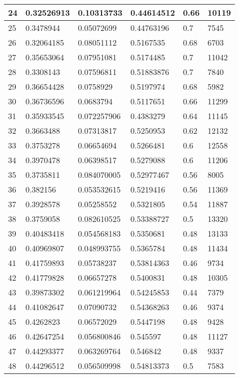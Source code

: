 \begin{longtable}{|l|l|l|l|l|l|}
24 & 0.32526913 & 0.10313733 & 0.44614512 & 0.66 & 10119 \\ \hline 
25 & 0.3478944 & 0.05072699 & 0.44763196 & 0.7 & 7545 \\ \hline 
26 & 0.32064185 & 0.08051112 & 0.5167535 & 0.68 & 6703 \\ \hline 
27 & 0.35653064 & 0.07951081 & 0.5174485 & 0.7 & 11042 \\ \hline 
28 & 0.3308143 & 0.07596811 & 0.51883876 & 0.7 & 7840 \\ \hline 
29 & 0.36654428 & 0.0758929 & 0.5197974 & 0.68 & 5982 \\ \hline 
30 & 0.36736596 & 0.0683794 & 0.5117651 & 0.66 & 11299 \\ \hline 
31 & 0.35933545 & 0.072257906 & 0.4383279 & 0.64 & 11145 \\ \hline 
32 & 0.3663488 & 0.07313817 & 0.5250953 & 0.62 & 12132 \\ \hline 
33 & 0.3753278 & 0.06654694 & 0.5266481 & 0.6 & 12558 \\ \hline 
34 & 0.3970478 & 0.06398517 & 0.5279088 & 0.6 & 11206 \\ \hline 
35 & 0.3735811 & 0.084070005 & 0.52977467 & 0.56 & 8005 \\ \hline 
36 & 0.382156 & 0.053532615 & 0.5219416 & 0.56 & 11369 \\ \hline 
37 & 0.3928578 & 0.05258552 & 0.5321805 & 0.54 & 11887 \\ \hline 
38 & 0.3759058 & 0.082610525 & 0.53388727 & 0.5 & 13320 \\ \hline 
39 & 0.40483418 & 0.054568183 & 0.5350681 & 0.48 & 13133 \\ \hline 
40 & 0.40969807 & 0.048993755 & 0.5365784 & 0.48 & 11434 \\ \hline 
41 & 0.41759893 & 0.05738237 & 0.53814363 & 0.46 & 9734 \\ \hline 
42 & 0.41779828 & 0.06657278 & 0.5400831 & 0.48 & 10305 \\ \hline 
43 & 0.39873302 & 0.061219964 & 0.54245853 & 0.44 & 7379 \\ \hline 
44 & 0.41082647 & 0.07090732 & 0.54368263 & 0.46 & 9374 \\ \hline 
45 & 0.4262823 & 0.06572029 & 0.5447198 & 0.48 & 9428 \\ \hline 
46 & 0.42647254 & 0.056800846 & 0.545597 & 0.48 & 11127 \\ \hline 
47 & 0.44293377 & 0.063269764 & 0.546842 & 0.48 & 9337 \\ \hline 
48 & 0.44296512 & 0.056509998 & 0.54813373 & 0.5 & 7583 \\ \hline 

\end{longtable}
